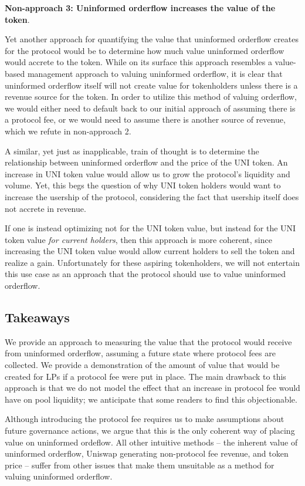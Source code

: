     \textbf{Non-approach 3: Uninformed orderflow increases the value of the token}.

    Yet another approach for quantifying the value that uninformed orderflow creates for the protocol would be to determine how much value uninformed orderflow would accrete to the token. While on its surface this approach resembles a value-based management approach to valuing uninformed orderflow, it is clear that uninformed orderflow itself will not create value for tokenholders unless there is a revenue source for the token. In order to utilize this method of valuing orderflow, we would either need to default back to our initial approach of assuming there is a protocol fee, or we would need to assume there is another source of revenue, which we refute in non-approach 2.

    A similar, yet just as inapplicable, train of thought is to determine the relationship between uninformed orderflow and the price of the UNI token. An increase in UNI token value would allow us to grow the protocol's liquidity and volume. Yet, this begs the question of why UNI token holders would want to increase the usership of the protocol, considering the fact that usership itself does not accrete in revenue. 

    If one is instead optimizing not for the UNI token value, but instead for the UNI token value \textit{for current holders}, then this approach is more coherent, since increasing the UNI token value would allow current holders to sell the token and realize a gain. Unfortunately for these aspiring tokenholders, we will not entertain this use case as an approach that the protocol should use to value uninformed orderflow.

\subsection{Takeaways}
    We provide an approach to measuring the value that the protocol would receive from uninformed orderflow, assuming a future state where protocol fees are collected. We provide a demonstration of the amount of value that would be created for LPs if a protocol fee were put in place. The main drawback to this approach is that we do not model the effect that an increase in protocol fee would have on pool liquidity; we anticipate that some readers to find this objectionable.

    Although introducing the protocol fee requires us to make assumptions about future governance actions, we argue that this is the only coherent way of placing value on uninformed ordeflow. All other intuitive methods -- the inherent value of uninformed orderflow, Uniswap generating non-protocol fee revenue, and token price -- suffer from other issues that make them unsuitable as a method for valuing uninformed orderflow.